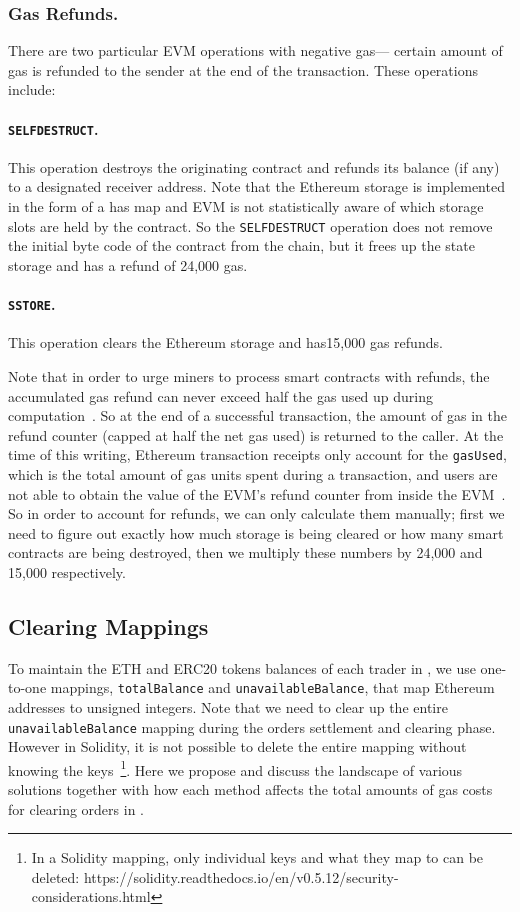 \subsubsection*{Gas Refunds.}There are two particular EVM operations with negative gas--- certain amount of gas is refunded to the sender at the end of the transaction. These operations include:

\paragraph{\texttt{SELFDESTRUCT}.}This operation destroys the originating contract and refunds its balance (if any) to a designated receiver address. Note that the Ethereum storage is implemented in the form of a has map and EVM is not statistically aware of which storage slots are held by the contract. So the \texttt{SELFDESTRUCT} operation does not remove the initial byte code of the contract from the chain, but it frees up the state storage and has a refund of 24,000 gas.

\paragraph{\texttt{SSTORE}.} This operation clears the Ethereum storage and has15,000 gas refunds. 

Note that in order to urge miners to process smart contracts with refunds, the accumulated gas refund can never exceed half the gas used up during computation~\cite{wood2014ethereum}. So at the end of a successful transaction, the amount of gas in the refund counter (capped at half the net gas used) is returned to the caller. At the time of this writing, Ethereum transaction receipts only account for the \texttt{gasUsed}, which is the total amount of gas units spent during a transaction, and users are not able to obtain the value of the EVM's refund counter from inside the EVM~\cite{signer2018gas}. So in order to account for refunds, we can only calculate them manually; first we need to figure out exactly how much storage is being cleared or how many smart contracts are being destroyed, then we multiply these numbers by 24,000 and 15,000 respectively. 


\subsection{Clearing Mappings}

To maintain the ETH and ERC20 tokens balances of each trader in \cm, we use one-to-one mappings, \texttt{totalBalance} and \texttt{unavailableBalance}, that map Ethereum addresses to unsigned integers. Note that we need to clear up the entire  \texttt{unavailableBalance} mapping during the orders settlement and clearing phase. However in Solidity, it is not possible to delete the entire mapping without knowing the keys~\footnote{In a Solidity mapping, only individual keys and what they map to can be deleted: https://solidity.readthedocs.io/en/v0.5.12/security-considerations.html}. Here we propose and discuss the landscape of various solutions together with how each method affects the total amounts of gas costs for clearing orders in \cm.


